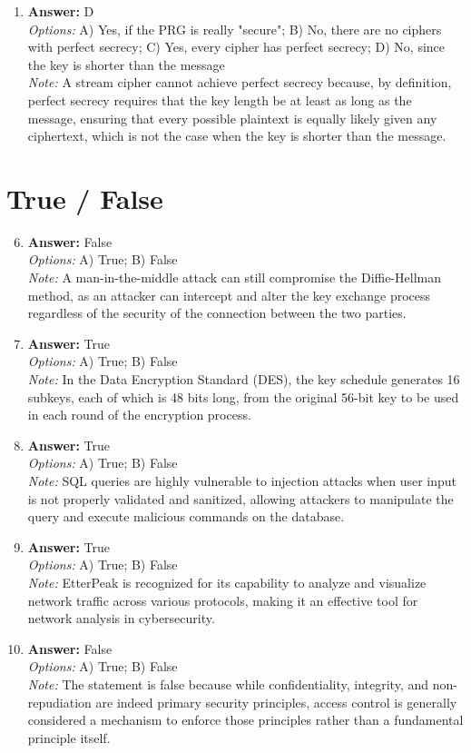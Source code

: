 \documentclass[12pt]{article}
\begin{document}
\begin{enumerate}[label=\arabic*.]
\item \textbf{Answer:} D
\\ \textit{Options:} A) Yes, if the PRG is really "secure"; B) No, there are no ciphers with perfect secrecy; C) Yes, every cipher has perfect secrecy; D) No, since the key is shorter than the message
\\ \textit{Note:} A stream cipher cannot achieve perfect secrecy because, by definition, perfect secrecy requires that the key length be at least as long as the message, ensuring that every possible plaintext is equally likely given any ciphertext, which is not the case when the key is shorter than the message.
\end{enumerate}

\section*{True / False}
\begin{enumerate}[label=\arabic*.]
\setcounter{enumi}{5}
\item \textbf{Answer:} False
\\ \textit{Options:} A) True; B) False
\\ \textit{Note:} A man-in-the-middle attack can still compromise the Diffie-Hellman method, as an attacker can intercept and alter the key exchange process regardless of the security of the connection between the two parties.
\item \textbf{Answer:} True
\\ \textit{Options:} A) True; B) False
\\ \textit{Note:} In the Data Encryption Standard (DES), the key schedule generates 16 subkeys, each of which is 48 bits long, from the original 56-bit key to be used in each round of the encryption process.
\item \textbf{Answer:} True
\\ \textit{Options:} A) True; B) False
\\ \textit{Note:} SQL queries are highly vulnerable to injection attacks when user input is not properly validated and sanitized, allowing attackers to manipulate the query and execute malicious commands on the database.
\item \textbf{Answer:} True
\\ \textit{Options:} A) True; B) False
\\ \textit{Note:} EtterPeak is recognized for its capability to analyze and visualize network traffic across various protocols, making it an effective tool for network analysis in cybersecurity.
\item \textbf{Answer:} False
\\ \textit{Options:} A) True; B) False
\\ \textit{Note:} The statement is false because while confidentiality, integrity, and non-repudiation are indeed primary security principles, access control is generally considered a mechanism to enforce those principles rather than a fundamental principle itself.
\end{enumerate}
\end{document}
